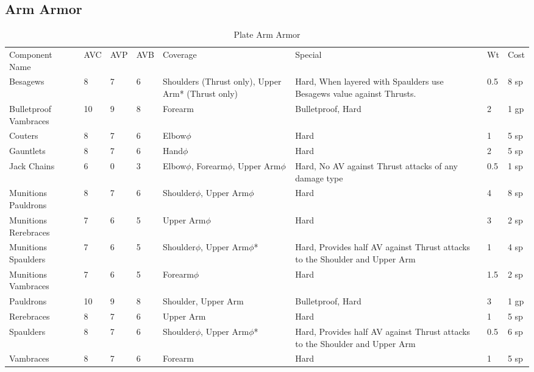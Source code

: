 \documentclass[oneside,11pt,english]{book}
\begin{document}
\subsection{Arm Armor}
\begin{longtabu} to 
	\caption{Plate Arm Armor}
	\label{tab:Plate Arm Armor}\\
Component Name&AVC&AVP&AVB& Coverage& Special& Wt&Cost\\
Besagews& 8& 7& 6& Shoulders (Thrust only), Upper Arm* (Thrust only)& Hard, When layered with Spaulders use Besagews value against Thrusts.& 0.5& 8 sp\\
Bulletproof Vambraces& 10& 9& 8& Forearm& Bulletproof, Hard& 2& 1 gp\\
Couters& 8& 7& 6& Elbow$\phi$& Hard& 1& 5 sp\\
Gauntlets& 8& 7& 6& Hand$\phi$& Hard& 2& 5 sp\\
Jack Chains& 6& 0& 3& Elbow$\phi$, Forearm$\phi$, Upper Arm$\phi$& Hard, No AV against Thrust attacks of any damage type& 0.5& 1 sp\\
Munitions Pauldrons& 8& 7& 6& Shoulder$\phi$, Upper Arm$\phi$& Hard& 4& 8 sp\\
Munitions Rerebraces& 7& 6& 5& Upper Arm$\phi$& Hard& 3& 2 sp\\
Munitions Spaulders& 7& 6& 5& Shoulder$\phi$, Upper Arm$\phi$*& Hard, Provides half AV against Thrust attacks to the Shoulder and Upper Arm& 1& 4 sp\\
Munitions Vambraces& 7& 6& 5& Forearm$\phi$& Hard& 1.5& 2 sp\\
Pauldrons& 10& 9& 8& Shoulder, Upper Arm& Bulletproof, Hard& 3& 1 gp\\
Rerebraces& 8& 7& 6& Upper Arm& Hard& 1& 5 sp\\
Spaulders& 8& 7& 6& Shoulder$\phi$, Upper Arm$\phi$*& Hard, Provides half AV against Thrust attacks to the Shoulder 
and Upper Arm& 0.5& 6 sp\\
Vambraces& 8& 7& 6& Forearm& Hard& 1& 5 sp\\
\end{longtabu}
\end{document}
